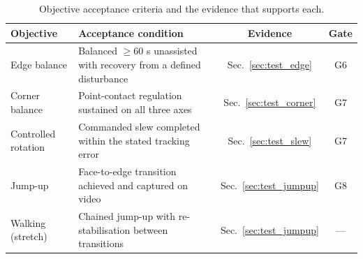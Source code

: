 \begin{table}[htbp]
\centering
\caption[Objective acceptance criteria and supporting evidence]{Objective acceptance criteria and the evidence that supports each.}
\label{tab:acceptance}
\small
\setlength{\tabcolsep}{4pt}
\begin{tabular}{L{3.0cm} L{6.4cm} c c}
\toprule
Objective & Acceptance condition & Evidence & Gate \\
\midrule
Edge balance & Balanced $\geq$60 s unassisted with recovery from a defined disturbance & Sec.~\ref{sec:test_edge} & G6 \\
Corner balance & Point-contact regulation sustained on all three axes & Sec.~\ref{sec:test_corner} & G7 \\
Controlled rotation & Commanded slew completed within the stated tracking error & Sec.~\ref{sec:test_slew} & G7 \\
Jump-up & Face-to-edge transition achieved and captured on video & Sec.~\ref{sec:test_jumpup} & G8 \\
Walking (stretch) & Chained jump-up with re-stabilisation between transitions & Sec.~\ref{sec:test_jumpup} & --- \\
\bottomrule
\end{tabular}
\end{table}
